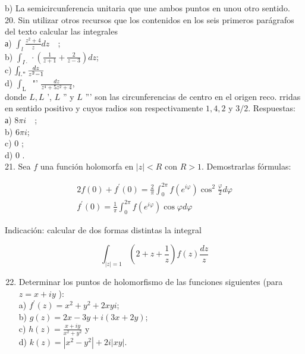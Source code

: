 \documentclass[10pt]{article}
\theoremstyle{plain}
\theoremstyle{definition}
\theoremstyle{remark}
\begin{document}
b) La semicircunferencia unitaria que une ambos puntos en unou otro sentido.\\
20. Sin utilizar otros recursos que los contenidos en los seis primeros parágrafos del texto calcular las integrales\\
а) $\int_{l} \frac{z^{2}+4}{z} d z \quad$;\\
b) $\int_{I \cdot} \cdot\left(\frac{1}{z+1}+\frac{2}{z-3}\right) d z$;\\
c) $\int_{l . "} \frac{d z}{z^{2}-1}$\\
d) $\int_{\text {L }}$ "' $\frac{d z}{z^{4}+5 z^{2}+4}$,\\
donde $L, L$ ', $L$ '' y $L$ ''' son las circunferencias de centro en el origen reco. rridas en sentido positivo y cuyos radios son respectivamente $1,4,2$ y $3 / 2$. Respuestas:\\
а) $8 \pi i \quad$;\\
b) $6 \pi i$;\\
c) 0 ;\\
d) 0 .\\
21. Sea $f$ una función holomorfa en $|z|<R$ con $R>1$. Demostrarlas fórmulas:

$$
\begin{gathered}
2 f(0)+f^{\prime}(0)=\frac{2}{\pi} \int_{0}^{2 \pi} f\left(e^{i \varphi}\right) \cos ^{2} \frac{\varphi}{2} d \varphi \\
f^{\prime}(0)=\frac{1}{\pi} \int_{0}^{2 \pi} f\left(e^{i \varphi}\right) \cos \varphi d \varphi
\end{gathered}
$$

Indicación: calcular de dos formas distintas la integral

$$
\int_{|z|=1}\left(2+z+\frac{1}{z}\right) f(z) \frac{d z}{z}
$$

\begin{enumerate}
  \setcounter{enumi}{21}
  \item Determinar los puntos de holomorfismo de las funciones siguientes (para $z=x+i y$ ):\\
a) $f^{\prime}(z)=x^{2}+y^{2}+2 x y i$;\\
b) $g(z)=2 x-3 y+i(3 x+2 y)$;\\
c) $h(z)=\frac{x+i y}{x^{2}+y^{2}}$ y\\
d) $k(z)=\left|x^{2}-y^{2}\right|+2 i|x y|$.
\end{enumerate}
\end{document}
